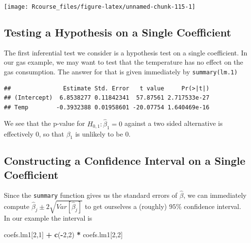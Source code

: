 \documentclass[]{book}
\newenvironment{Shaded}{\begin{snugshade}}{\end{snugshade}}
\newcommand{\KeywordTok}[1]{\textcolor[rgb]{0.13,0.29,0.53}{\textbf{#1}}}
\newcommand{\DecValTok}[1]{\textcolor[rgb]{0.00,0.00,0.81}{#1}}
\newcommand{\StringTok}[1]{\textcolor[rgb]{0.31,0.60,0.02}{#1}}
\newcommand{\OperatorTok}[1]{\textcolor[rgb]{0.81,0.36,0.00}{\textbf{#1}}}
\newcommand{\NormalTok}[1]{#1}
\theoremstyle{definition}
\theoremstyle{definition}
\theoremstyle{definition}
\theoremstyle{remark}
\begin{document}
\texttt{[image: Rcourse\_files/figure-latex/unnamed-chunk-115-1]}

\subsection{Testing a Hypothesis on a Single
Coefficient}\label{testing-a-hypothesis-on-a-single-coefficient}

The first inferential test we consider is a hypothesis test on a single
coefficient. In our gas example, we may want to test that the
temperature has no effect on the gas consumption. The answer for that is
given immediately by \texttt{summary(lm.1)}

\begin{Shaded}
\end{Shaded}

\begin{verbatim}
##               Estimate Std. Error   t value     Pr(>|t|)
## (Intercept)  6.8538277 0.11842341  57.87561 2.717533e-27
## Temp        -0.3932388 0.01958601 -20.07754 1.640469e-16
\end{verbatim}

We see that the p-value for \(H_{0,1}:\hat \beta_1=0\) against a two
sided alternative is effectively 0, so that \(\beta_1\) is unlikely to
be \(0\).

\subsection{Constructing a Confidence Interval on a Single
Coefficient}\label{constructing-a-confidence-interval-on-a-single-coefficient}

Since the \texttt{summary} function gives us the standard errors of
\(\hat \beta\), we can immediately compute
\(\hat \beta_j \pm 2 \sqrt{Var[\hat \beta_j]}\) to get ourselves a
(roughly) \(95\%\) confidence interval. In our example the interval is

\begin{Shaded}
\begin{Highlighting}[]
\NormalTok{coefs.lm1[}\DecValTok{2}\NormalTok{,}\DecValTok{1}\NormalTok{] }\OperatorTok{+}\StringTok{ }\KeywordTok{c}\NormalTok{(}\OperatorTok{-}\DecValTok{2}\NormalTok{,}\DecValTok{2}\NormalTok{) }\OperatorTok{*}\StringTok{ }\NormalTok{coefs.lm1[}\DecValTok{2}\NormalTok{,}\DecValTok{2}\NormalTok{]}
\end{Highlighting}
\end{Shaded}
\end{document}
